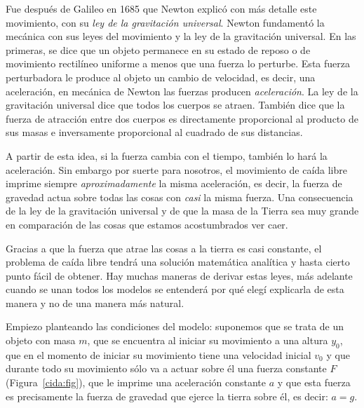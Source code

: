 Fue después de Galileo en 1685 que Newton explicó con más detalle este movimiento, con su \emph{ley de la gravitación universal}.
Newton fundamentó la mecánica con sus leyes del movimiento y la ley de la gravitación universal.
En las primeras, se dice que un objeto permanece en su estado de reposo o de movimiento rectilíneo uniforme a menos que una fuerza lo perturbe.
Esta fuerza perturbadora le produce al objeto un cambio de velocidad, es decir, una aceleración, en mecánica de Newton las fuerzas producen \emph{aceleración}.
La ley de la gravitación universal dice que todos los cuerpos se atraen.
También dice que la fuerza de atracción entre dos cuerpos es directamente proporcional al producto de sus masas e inversamente proporcional al cuadrado de sus distancias.

A partir de esta idea, si la fuerza cambia con el tiempo, también lo hará la aceleración.
Sin embargo por suerte para nosotros, el movimiento de caída libre imprime siempre \emph{aproximadamente} la misma aceleración, es decir, la fuerza de gravedad actua sobre todas las cosas con \emph{casi} la misma fuerza.
Una consecuencia de la ley de la gravitación universal y de que la masa de la Tierra sea muy grande en comparación de las cosas que estamos acostumbrados ver caer.

Gracias a que la fuerza que atrae las cosas a la tierra es casi constante, el problema de caída libre tendrá una solución matemática analítica y hasta cierto punto fácil de obtener.
Hay muchas maneras de derivar estas leyes, más adelante cuando se unan todos los modelos se entenderá por qué elegí explicarla de esta manera y no de una manera más natural.

Empiezo planteando las condiciones del modelo: suponemos que se trata de un objeto con masa $m$, que se encuentra al iniciar su movimiento a una altura $y_0$, que en el momento de iniciar su movimiento tiene una velocidad inicial $v_0$ y que durante todo su movimiento sólo va a actuar sobre él una fuerza constante $F$ (Figura~\ref{cida:fig}), que le imprime una aceleración constante $a$ y que esta fuerza es precisamente la fuerza de gravedad que ejerce la tierra sobre él, es decir: $a = g$.

